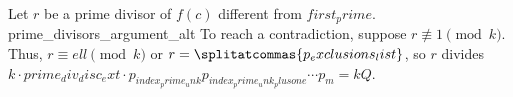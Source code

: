 Let $r$ be a prime divisor of $f(c)$ different from ${first_prime}$. {prime_divisors_argument_alt} To reach a contradiction, suppose $r\not\equiv 1\pmod{{k}}$. Thus, $r\equiv {ell}\pmod{{k}}$ or $r=\splitatcommas{{p_exclusions_list}}$, so $r$ divides ${k}\cdot{prime_div_disc_ext}\cdot p_{{index_prime_unk}}p_{{index_prime_unk_plusone}}\cdots p_m={k}Q$.